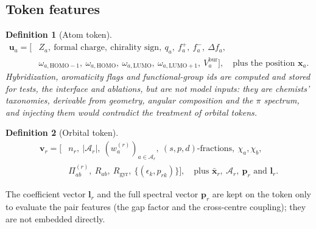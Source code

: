 \documentclass[11pt,a4paper]{article}
\newcommand{\vb}[1]{\bm{#1}}
\newcommand{\set}[1]{\{#1\}}
\newtheorem{definition}{Definition}
\begin{document}
\subsection{Token features}
\begin{definition}[Atom token]
\begin{align*}
\vb{u}_a=\big[&Z_a,\ \text{formal charge},\ \text{chirality sign},\ q_a,\ f^+_a,\ f^-_a,\ \Delta f_a,\\
&\omega_{a,\mathrm{HOMO-1}},\ \omega_{a,\mathrm{HOMO}},\ \omega_{a,\mathrm{LUMO}},\ \omega_{a,\mathrm{LUMO+1}},\ V^{\mathrm{bur}}_a\big],\quad\text{plus the position }\vb{x}_a .
\end{align*}
Hybridization, aromaticity flags and functional-group ids are computed and stored for tests, the interface and ablations, but are not model inputs: they are chemists' taxonomies, derivable from geometry, angular composition and the $\pi$ spectrum, and injecting them would contradict the treatment of orbital tokens.
\end{definition}
\begin{definition}[Orbital token]
\begin{align*}
\vb{v}_r=\big[&n_r,\ |\mathcal{A}_r|,\ (w^{(r)}_a)_{a\in\mathcal{A}_r},\ (s,p,d)\text{-fractions},\ \chi_a,\chi_b,\\
&\Pi^{(r)}_{ab},\ R_{ab},\ R_{\mathrm{gyr}},\ \set{(\epsilon_k,p_{rk})}\big],\quad\text{plus }\bar{\vb{x}}_r,\ \mathcal{A}_r,\ \vb{p}_r\text{ and }\vb{l}_r .
\end{align*}
\end{definition}
The coefficient vector $\vb{l}_r$ and the full spectral vector $\vb{p}_r$ are kept on the token only to evaluate the pair features (the gap factor and the cross-centre coupling); they are not embedded directly.
\end{document}
